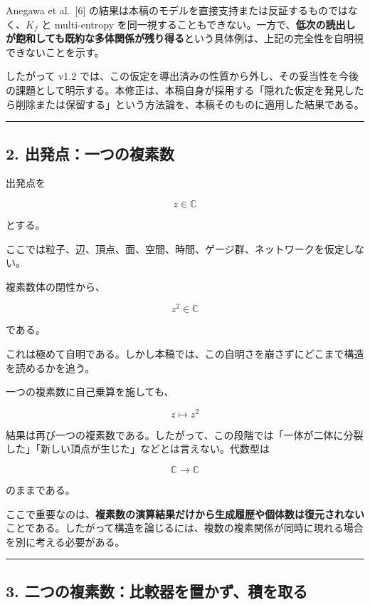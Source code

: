 \documentclass[
  a4paper,
]{ltjsarticle}
\begin{document}
Anegawa et al.~{[}6{]}
の結果は本稿のモデルを直接支持または反証するものではなく、\(K_f\) と
multi-entropy
を同一視することもできない。一方で、\textbf{低次の読出しが飽和しても既約な多体関係が残り得る}という具体例は、上記の完全性を自明視できないことを示す。

したがって v1.2
では、この仮定を導出済みの性質から外し、その妥当性を今後の課題として明示する。本修正は、本稿自身が採用する「隠れた仮定を発見したら削除または保留する」という方法論を、本稿そのものに適用した結果である。

\begin{center}\rule{0.5\linewidth}{0.5pt}\end{center}

\subsection{2.
出発点：一つの複素数}\label{ux51faux767aux70b9ux4e00ux3064ux306eux8907ux7d20ux6570}

出発点を

\[
z\in\mathbb C
\]

とする。

ここでは粒子、辺、頂点、面、空間、時間、ゲージ群、ネットワークを仮定しない。

複素数体の閉性から、

\[
z^2\in\mathbb C
\]

である。

これは極めて自明である。しかし本稿では、この自明さを崩さずにどこまで構造を読めるかを追う。

一つの複素数に自己乗算を施しても、

\[
z\mapsto z^2
\]

結果は再び一つの複素数である。したがって、この段階では「一体が二体に分裂した」「新しい頂点が生じた」などとは言えない。代数型は

\[
\mathbb C\to\mathbb C
\]

のままである。

ここで重要なのは、\textbf{複素数の演算結果だけから生成履歴や個体数は復元されない}ことである。したがって構造を論じるには、複数の複素関係が同時に現れる場合を別に考える必要がある。

\begin{center}\rule{0.5\linewidth}{0.5pt}\end{center}

\subsection{3.
二つの複素数：比較器を置かず、積を取る}\label{ux4e8cux3064ux306eux8907ux7d20ux6570ux6bd4ux8f03ux5668ux3092ux7f6eux304bux305aux7a4dux3092ux53d6ux308b}
\end{document}
